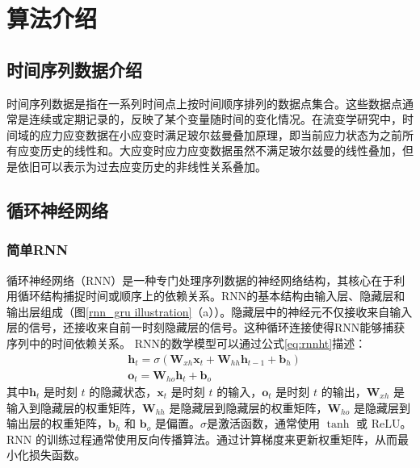 \section{算法介绍}
\subsection{时间序列数据介绍}
时间序列数据是指在一系列时间点上按时间顺序排列的数据点集合。这些数据点通常是连续或定期记录的，反映了某个变量随时间的变化情况。在流变学研究中，时间域的应力应变数据在小应变时满足玻尔兹曼叠加原理，即当前应力状态为之前所有应变历史的线性和\cite{boltzmannZurTheorieElastischen1878}。大应变时应力应变数据虽然不满足玻尔兹曼的线性叠加，但是依旧可以表示为过去应变历史的非线性关系叠加。

\subsection{循环神经网络}
\subsubsection{简单RNN}
循环神经网络（RNN）是一种专门处理序列数据的神经网络结构，其核心在于利用循环结构捕捉时间或顺序上的依赖关系\cite{elmanFindingStructureTime1990}。RNN的基本结构由输入层、隐藏层和输出层组成（图\ref{rnn_gru illustration}（a））。隐藏层中的神经元不仅接收来自输入层的信号，还接收来自前一时刻隐藏层的信号。这种循环连接使得RNN能够捕获序列中的时间依赖关系。
RNN的数学模型可以通过公式\eqref{eq:rnnht}描述：
\begin{align}
   & \mathbf{h}_t = \sigma(\mathbf{W}_{xh} \mathbf{x}_t + \mathbf{W}_{hh} \mathbf{h}_{t-1} + \mathbf{b}_h) \label{eq:rnnht} \\
   & {\mathbf{o}_t = \mathbf{W}_{ho} \mathbf{h}_t + \mathbf{b}_o} \label{eq:rnnot}
\end{align}
其中$\mathbf{h}_t$ 是时刻 $t$ 的隐藏状态，$\mathbf{x}_t$ 是时刻 $t$ 的输入，$\mathbf{o}_t$ 是时刻 $t$ 的输出，$\mathbf{W}_{xh}$ 是输入到隐藏层的权重矩阵，$\mathbf{W}_{hh}$ 是隐藏层到隐藏层的权重矩阵，$\mathbf{W}_{ho}$ 是隐藏层到输出层的权重矩阵，$\mathbf{b}_h$ 和 $\mathbf{b}_o$ 是偏置。$\sigma$是激活函数，通常使用 $\tanh$ 或 $\text{ReLU}$。RNN 的训练过程通常使用反向传播算法。通过计算梯度来更新权重矩阵，从而最小化损失函数。

